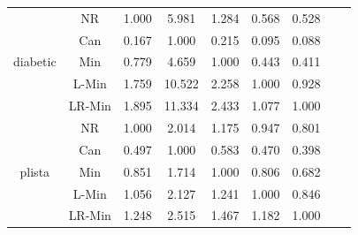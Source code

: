 \documentclass[11pt]{book}
\begin{document}
\begin{table}
\begin{tabular}{|c|c|c|c|c|c|c|c|c|}
    \hline
    \multirow{5}{*}{diabetic}
         & NR & 1.000 & 5.981 & 1.284 & 0.568 & 0.528 \\                                                                                                                                                             
         & Can & 0.167 & 1.000 & 0.215 & 0.095 & 0.088 \\                                                                                                                                                            
         & Min & 0.779 & 4.659 & 1.000 & 0.443 & 0.411 \\                                                                                                                                                            
         & L-Min & 1.759 & 10.522 & 2.258 & 1.000 & 0.928 \\                                                                                                                                                         
         & LR-Min & 1.895 & 11.334 & 2.433 & 1.077 & 1.000 \\  
    
    \hline
    \multirow{5}{*}{plista}
         & NR & 1.000 & 2.014 & 1.175 & 0.947 & 0.801 \\                                                                                                                                                             
         & Can & 0.497 & 1.000 & 0.583 & 0.470 & 0.398 \\                                                                                                                                                            
         & Min & 0.851 & 1.714 & 1.000 & 0.806 & 0.682 \\                                                                                                                                                            
         & L-Min & 1.056 & 2.127 & 1.241 & 1.000 & 0.846 \\                                                                                                                                                          
         & LR-Min & 1.248 & 2.515 & 1.467 & 1.182 & 1.000 \\
  

\end{tabular}
\end{table}
\end{document}

